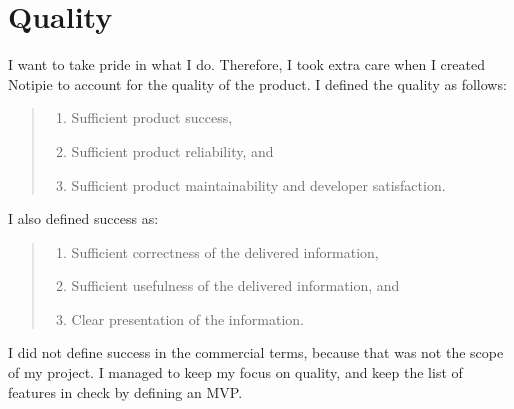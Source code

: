 \section{Quality}\label{sec:quality}

I want to take pride in what I do.
Therefore,
I took extra care when I created Notipie
to account for the quality of the product.
I defined the quality as follows:

\begin{quote}
  \begin{enumerate}
    \item Sufficient product success,
    \item Sufficient product reliability, and
    \item Sufficient product maintainability and developer satisfaction.
  \end{enumerate}
\end{quote}

I also defined success as:

\begin{quote}
  \begin{enumerate}
    \item Sufficient correctness of the delivered information,
    \item Sufficient usefulness of the delivered information, and
    \item Clear presentation of the information.
  \end{enumerate}
\end{quote}

I did not define success in the commercial terms,
because that was not the scope of my project.
I managed to keep my focus on quality,
and keep the list of features in check
by defining an MVP.


